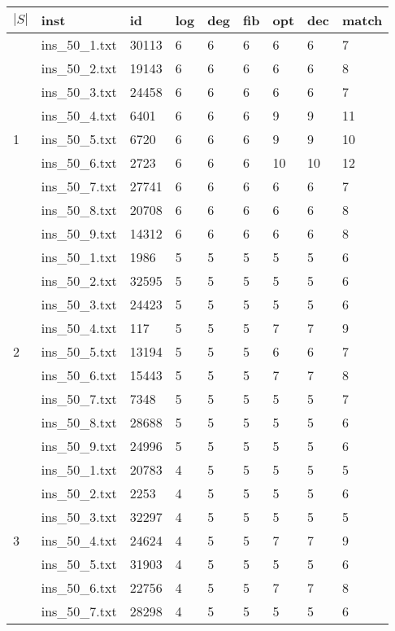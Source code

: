 \begin{table}[]
\begin{tabular}{lllllllll}
 $|S|$ & inst & id & log & deg & fib & opt & dec & match \\\hline
\multirow{9}{*}{1}
& ins\_50\_1.txt & 30113 & 6 & 6 & 6 & 6  & 6   & 7 \\
& ins\_50\_2.txt & 19143 & 6 & 6 & 6 & 6  & 6   & 8 \\
& ins\_50\_3.txt & 24458 & 6 & 6 & 6 & 6  & 6   & 7 \\
& ins\_50\_4.txt & 6401  & 6 & 6 & 6 & 9  & 9   & 11 \\
& ins\_50\_5.txt & 6720  & 6 & 6 & 6 & 9  & 9   & 10 \\
& ins\_50\_6.txt & 2723  & 6 & 6 & 6 & 10 & 10  & 12 \\
& ins\_50\_7.txt & 27741 & 6 & 6 & 6 & 6  & 6   & 7 \\
& ins\_50\_8.txt & 20708 & 6 & 6 & 6 & 6  & 6   & 8 \\
& ins\_50\_9.txt & 14312 & 6 & 6 & 6 & 6  & 6   & 8 \\
\hline 
\multirow{9}{*}{2}
& ins\_50\_1.txt & 1986  & 5 & 5 & 5 & 5  & 5   & 6 \\
& ins\_50\_2.txt & 32595 & 5 & 5 & 5 & 5  & 5   & 6 \\
& ins\_50\_3.txt & 24423 & 5 & 5 & 5 & 5  & 5   & 6 \\
& ins\_50\_4.txt & 117   & 5 & 5 & 5 & 7  & 7   & 9 \\
& ins\_50\_5.txt & 13194 & 5 & 5 & 5 & 6  & 6   & 7 \\
& ins\_50\_6.txt & 15443 & 5 & 5 & 5 & 7  & 7   & 8 \\
& ins\_50\_7.txt & 7348  & 5 & 5 & 5 & 5  & 5   & 7 \\
& ins\_50\_8.txt & 28688 & 5 & 5 & 5 & 5  & 5   & 6 \\
& ins\_50\_9.txt & 24996 & 5 & 5 & 5 & 5  & 5   & 6 \\
\hline 
\multirow{9}{*}{3}
& ins\_50\_1.txt & 20783 & 4 & 5 & 5 & 5  & 5   & 5 \\
& ins\_50\_2.txt & 2253  & 4 & 5 & 5 & 5  & 5   & 6 \\
& ins\_50\_3.txt & 32297 & 4 & 5 & 5 & 5  & 5   & 5 \\
& ins\_50\_4.txt & 24624 & 4 & 5 & 5 & 7  & 7   & 9 \\
& ins\_50\_5.txt & 31903 & 4 & 5 & 5 & 5  & 5   & 6 \\
& ins\_50\_6.txt & 22756 & 4 & 5 & 5 & 7  & 7   & 8 \\
& ins\_50\_7.txt & 28298 & 4 & 5 & 5 & 5  & 5   & 6 \\

\end{tabular}
\end{table}

